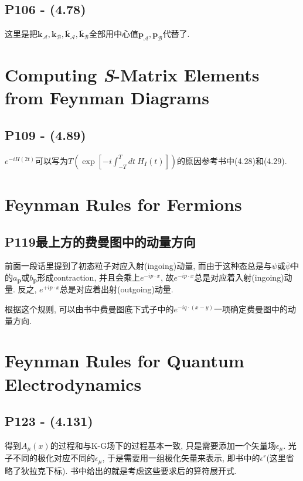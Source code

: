 \subsection{P106 - (4.78)}

这里是把$\mathbf{k}_{\mathcal{A}}, \mathbf{k}_{\mathcal{B}}, \bar{\mathbf{k}}_{\mathcal{A}}, \bar{\mathbf{k}}_{\mathcal{B}}$全部用中心值$\mathbf{p}_{\mathcal{A}}, \mathbf{p}_{\mathcal{B}}$代替了.

\section{Computing \textit{S}-Matrix Elements from Feynman Diagrams}

\subsection{P109 - (4.89)}

$e^{-iH(2t)}$可以写为$T(\exp[-i\int_{-T}^{T}dt\ H_I(t)])$的原因参考书中(4.28)和(4.29).

\section{Feynman Rules for Fermions}

\subsection{P119最上方的费曼图中的动量方向}

前面一段话里提到了初态粒子对应入射(ingoing)动量, 而由于这种态总是与$\psi$或$\bar{\psi}$中的$a_{\mathbf{p}}$或$b_{\mathbf{p}}$形成contraction, 并且会乘上$e^{-ip\cdot x}$, 故$e^{-ip\cdot x}$总是对应着入射(ingoing)动量.
反之, $e^{+ip\cdot x}$总是对应着出射(outgoing)动量.

根据这个规则, 可以由书中费曼图底下式子中的$e^{-iq\cdot (x-y)}$一项确定费曼图中的动量方向.

\section{Feynman Rules for Quantum Electrodynamics}

\subsection{P123 - (4.131)}

得到$A_\mu(x)$的过程和与K-G场下的过程基本一致, 只是需要添加一个矢量场$\epsilon_\mu$. 光子不同的极化对应不同的$\epsilon_\mu$, 于是需要用一组极化矢量来表示, 即书中的$\epsilon^r$(这里省略了狄拉克下标). 书中给出的就是考虑这些要求后的算符展开式.